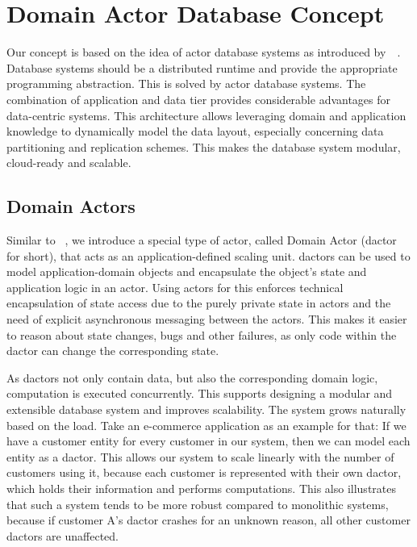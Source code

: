 
\section{Domain Actor Database Concept}\label{sec:concept}
  Our concept is based on the idea of actor database systems as introduced by~\citeauthor{manifesto}~\cite{manifesto}.
  Database systems should be a distributed runtime and provide the appropriate programming abstraction.
  This is solved by actor database systems.
  The combination of application and data tier provides considerable advantages for data-centric systems.
  This architecture allows leveraging domain and application knowledge to dynamically model the data layout, especially concerning data partitioning and replication schemes.
  This makes the database system modular, cloud-ready and scalable.

  \subsection{Domain Actors}\label{sec:dactors}
    Similar to \citeauthor{Shah:reactdb}~\cite{Shah:reactdb}, we introduce a special type of actor, called Domain Actor (\gls{dactor} for short), that acts as an application-defined scaling unit.
    \glspl{dactor} can be used to model application-domain objects and encapsulate the object's state and application logic in an actor.
    Using actors for this enforces technical encapsulation of state access due to the purely private state in actors and the need of explicit asynchronous messaging between the actors.
    This makes it easier to reason about state changes, bugs and other failures, as only code within the \gls{dactor} can change the corresponding state.

    As \glspl{dactor} not only contain data, but also the corresponding domain logic, computation is executed concurrently.
    This supports designing a modular and extensible database system and improves scalability.
    The system grows naturally based on the load.
    Take an e-commerce application as an example for that:
    If we have a customer entity for every customer in our system, then we can model each entity as a \gls{dactor}.
    This allows our system to scale linearly with the number of customers using it, because each customer is represented with their own \gls{dactor}, which holds their information and performs computations.
    This also illustrates that such a system tends to be more robust compared to monolithic systems, because if customer A's \gls{dactor} crashes for an unknown reason, all other customer \glspl{dactor} are unaffected.

